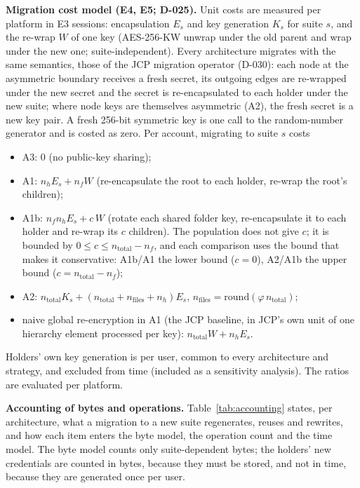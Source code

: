 \documentclass[11pt,a4paper]{article}
\begin{document}
\textbf{Migration cost model (E4, E5; D-025).} Unit costs are measured per platform in E3 sessions: encapsulation $E_s$ and key generation $K_s$ for suite $s$, and the re-wrap $W$ of one key (AES-256-KW unwrap under the old parent and wrap under the new one; suite-independent). Every architecture migrates with the same semantics, those of the JCP migration operator (D-030): each node at the asymmetric boundary receives a fresh secret, its outgoing edges are re-wrapped under the new secret and the secret is re-encapsulated to each holder under the new suite; where node keys are themselves asymmetric (A2), the fresh secret is a new key pair. A fresh 256-bit symmetric key is one call to the random-number generator and is costed as zero. Per account, migrating to suite $s$ costs
\begin{itemize}
\item A3: 0 (no public-key sharing);
\item A1: $n_h E_s + n_f W$ (re-encapsulate the root to each holder, re-wrap the root's children);
\item A1b: $n_f n_h E_s + c\,W$ (rotate each shared folder key, re-encapsulate it to each holder and re-wrap its $c$ children). The population does not give $c$; it is bounded by $0 \le c \le n_{\mathrm{total}} - n_f$, and each comparison uses the bound that makes it conservative: A1b/A1 the lower bound ($c = 0$), A2/A1b the upper bound ($c = n_{\mathrm{total}} - n_f$);
\item A2: $n_{\mathrm{total}} K_s + (n_{\mathrm{total}} + n_{\mathrm{files}} + n_h) E_s$, $n_{\mathrm{files}} = \mathrm{round}(\varphi\, n_{\mathrm{total}})$;
\item naive global re-encryption in A1 (the JCP baseline, in JCP's own unit of one hierarchy element processed per key): $n_{\mathrm{total}} W + n_h E_s$.
\end{itemize}
Holders' own key generation is per user, common to every architecture and strategy, and excluded from time (included as a sensitivity analysis). The ratios are evaluated per platform.

\textbf{Accounting of bytes and operations.} Table~\ref{tab:accounting} states, per architecture, what a migration to a new suite regenerates, reuses and rewrites, and how each item enters the byte model, the operation count and the time model. The byte model counts only suite-dependent bytes; the holders' new credentials are counted in bytes, because they must be stored, and not in time, because they are generated once per user.
\end{document}
